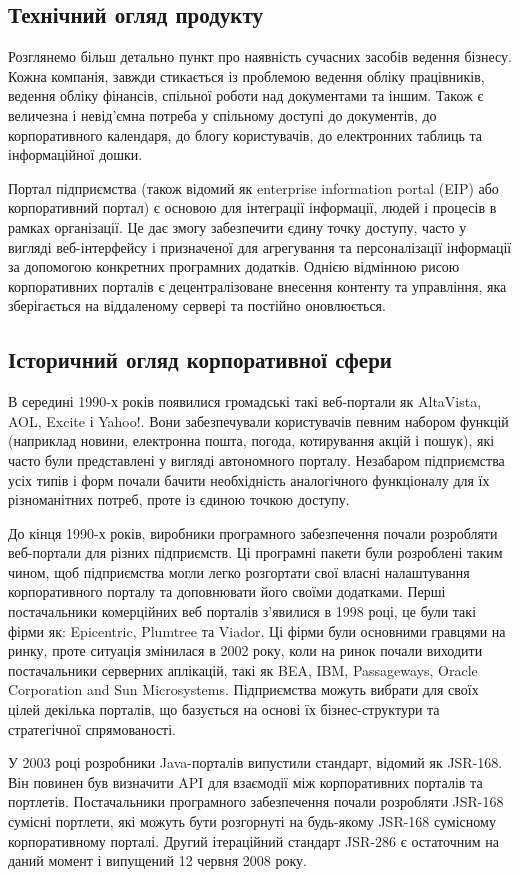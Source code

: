 \subsection{Технічний огляд продукту}
Розглянемо більш детально пункт про наявність сучасних засобів ведення бізнесу. 
Кожна компанія, завжди стикається із проблемою ведення обліку працівників, ведення обліку фінансів, спільної роботи над документами та іншим.
Також є величезна і невід'ємна потреба у спільному доступі до документів, до корпоративного календаря, до блогу користувачів, до електронних таблиць та інформаційної дошки.
\par Портал підприємства (також відомий як enterprise information portal (EIP) або корпоративний портал) є основою для інтеграції інформації, людей і процесів в рамках організації. 
Це дає змогу забезпечити єдину точку доступу, часто у вигляді веб-інтерфейсу і призначеної для агрегування та персоналізації інформації за допомогою конкретних програмних додатків. Однією відмінною рисою корпоративних порталів є децентралізоване внесення контенту та управління, яка зберігається на віддаленому сервері та постійно оновлюється.
\subsection{Історичний огляд корпоративної сфери}
В середині 1990-х років появилися громадські такі веб-портали як AltaVista, AOL, Excite і Yahoo!. 
Вони забезпечували користувачів певним набором функцій (наприклад новини, електронна пошта, погода, котирування акцій і пошук), які часто були представлені у вигляді автономного порталу.
Незабаром підприємства усіх типів і форм почали бачити необхідність аналогічного функціоналу для їх різноманітних потреб, проте із єдиною точкою доступу.
\par До кінця 1990-х років, виробники програмного забезпечення почали розробляти веб-портали для різних підприємств. 
Ці програмні пакети були розроблені таким чином, щоб підприємства могли легко розгортати свої власні налаштування корпоративного порталу та доповнювати його своїми додатками.
Перші постачальники комерційних веб порталів з'явилися в 1998 році, це були такі фірми як: Epicentric, Plumtree  та Viador. 
Ці фірми були основними гравцями на ринку, проте ситуація змінилася в 2002 року, коли на ринок почали виходити постачальники серверних аплікацій, такі як BEA, IBM, Passageways, Oracle Corporation and Sun Microsystems.
Підприємства можуть вибрати для своїх цілей декілька порталів, що базується на основі їх бізнес-структури та стратегічної спрямованості.
\par У 2003 році розробники Java-порталів випустили стандарт, відомий як JSR-168. 
Він повинен був визначити API для взаємодії між корпоративних порталів та портлетів.
Постачальники програмного забезпечення почали розробляти JSR-168 сумісні портлети, які можуть бути розгорнуті на будь-якому JSR-168 сумісному корпоративному порталі. 
Другий ітераційний стандарт JSR-286 є остаточним на даний момент і випущений 12 червня 2008 року.

